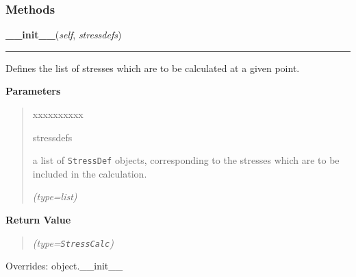   \subsubsection{Methods}

    \vspace{0.5ex}

\hspace{.8\funcindent}\begin{boxedminipage}{\funcwidth}

    \raggedright \textbf{\_\_init\_\_}(\textit{self}, \textit{stressdefs})

    \vspace{-1.5ex}

    \rule{\textwidth}{0.5\fboxrule}
\setlength{\parskip}{2ex}
    Defines the list of stresses which are to be calculated at a given 
    point.

\setlength{\parskip}{1ex}
      \textbf{Parameters}
      \vspace{-1ex}

      \begin{quote}
        \begin{Ventry}{xxxxxxxxxx}

          \item[stressdefs]

          a list of \texttt{StressDef} objects, corresponding to the 
          stresses which are to be included in the calculation.

            {\it (type=list)}

        \end{Ventry}

      \end{quote}

      \textbf{Return Value}
    \vspace{-1ex}

      \begin{quote}
      {\it (type=\texttt{StressCalc})}

      \end{quote}

      Overrides: object.\_\_init\_\_

    \end{boxedminipage}

    \label{satstress:SatStress:StressCalc:tensor}

